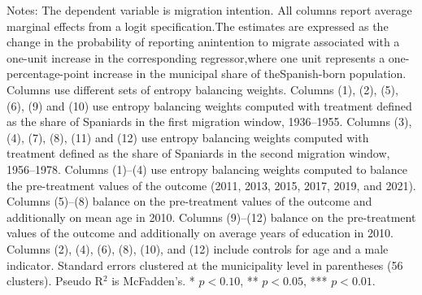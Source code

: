 \begin{table}[!h]
\caption*{\footnotesize Notes: The dependent variable is migration intention. All columns report average marginal effects from a logit specification.The estimates are expressed as the change in the probability of reporting anintention to migrate associated with a one-unit increase in the corresponding regressor,where one unit represents a one-percentage-point increase in the municipal share of theSpanish-born population. Columns use different sets of entropy balancing weights. Columns (1), (2), (5), (6), (9) and (10) use entropy balancing weights computed with treatment defined as the share of Spaniards in the first migration window, 1936--1955. Columns (3), (4), (7), (8), (11) and (12) use entropy balancing weights computed with treatment defined as the share of Spaniards in the second migration window, 1956--1978. Columns (1)--(4) use entropy balancing weights computed to balance the pre-treatment values of the outcome (2011, 2013, 2015, 2017, 2019, and 2021). Columns (5)--(8) balance on the pre-treatment values of the outcome and additionally on mean age in 2010. Columns (9)--(12) balance on the pre-treatment values of the outcome and additionally on average years of education in 2010. Columns (2), (4), (6), (8), (10), and (12) include controls for age and a male indicator. Standard errors clustered at the municipality level in parentheses (56 clusters). Pseudo R$^2$ is McFadden's. * $p<0.10$, ** $p<0.05$, *** $p<0.01$.}
\end{table}

